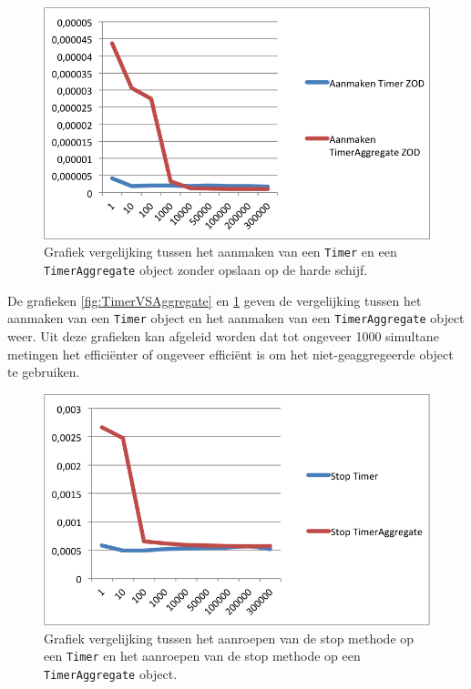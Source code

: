 \begin{figure}[h]
  \centering
  \includegraphics[scale=1.0]{Afbeeldingen/Evaluatie/TimerVSAggregateZOD}
  \caption{Grafiek vergelijking tussen het aanmaken van een \texttt{Timer} en een \texttt{TimerAggregate} object zonder opslaan op de harde schijf.}
  \label{fig:TimerVSAggregateZOD}
\end{figure}

De grafieken \ref{fig:TimerVSAggregate} en \ref{fig:TimerVSAggregateZOD} geven de vergelijking tussen het aanmaken van een \texttt{Timer} object en het aanmaken van een \texttt{TimerAggregate} object weer. Uit deze grafieken kan afgeleid worden dat tot ongeveer 1000 simultane metingen het effici\"enter of ongeveer effici\"ent is om het niet-geaggregeerde object te gebruiken. \\

\begin{figure}[h]
  \centering
  \includegraphics[scale=1.0]{Afbeeldingen/Evaluatie/StopVSTimerAggregate}
  \caption{Grafiek vergelijking tussen het aanroepen van de stop methode op een \texttt{Timer} en het aanroepen van de stop methode op een \texttt{TimerAggregate} object.}
  \label{fig:StopVSTimerAggregate}
\end{figure}


